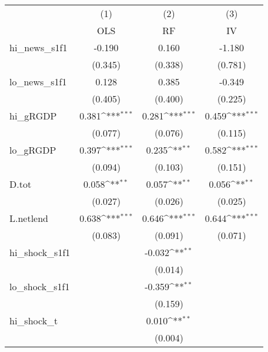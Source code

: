 {
\def\sym#1{\ifmmode^{#1}\else\(^{#1}\)\fi}
\begin{tabular}{l*{3}{c}}
\toprule
            &\multicolumn{1}{c}{(1)}&\multicolumn{1}{c}{(2)}&\multicolumn{1}{c}{(3)}\\
            &\multicolumn{1}{c}{OLS}&\multicolumn{1}{c}{RF}&\multicolumn{1}{c}{IV}\\
\midrule
hi\_news\_s1f1&      -0.190         &       0.160         &      -1.180         \\
            &     (0.345)         &     (0.338)         &     (0.781)         \\
\addlinespace
lo\_news\_s1f1&       0.128         &       0.385         &      -0.349         \\
            &     (0.405)         &     (0.400)         &     (0.225)         \\
\addlinespace
hi\_gRGDP    &       0.381\sym{***}&       0.281\sym{***}&       0.459\sym{***}\\
            &     (0.077)         &     (0.076)         &     (0.115)         \\
\addlinespace
lo\_gRGDP    &       0.397\sym{***}&       0.235\sym{**} &       0.582\sym{***}\\
            &     (0.094)         &     (0.103)         &     (0.151)         \\
\addlinespace
D.tot       &       0.058\sym{**} &       0.057\sym{**} &       0.056\sym{**} \\
            &     (0.027)         &     (0.026)         &     (0.025)         \\
\addlinespace
L.netlend   &       0.638\sym{***}&       0.646\sym{***}&       0.644\sym{***}\\
            &     (0.083)         &     (0.091)         &     (0.071)         \\
\addlinespace
hi\_shock\_s1f1&                     &      -0.032\sym{**} &                     \\
            &                     &     (0.014)         &                     \\
\addlinespace
lo\_shock\_s1f1&                     &      -0.359\sym{**} &                     \\
            &                     &     (0.159)         &                     \\
\addlinespace
hi\_shock\_t  &                     &       0.010\sym{**} &                     \\
            &                     &     (0.004)         &                     \\

\end{tabular}}
